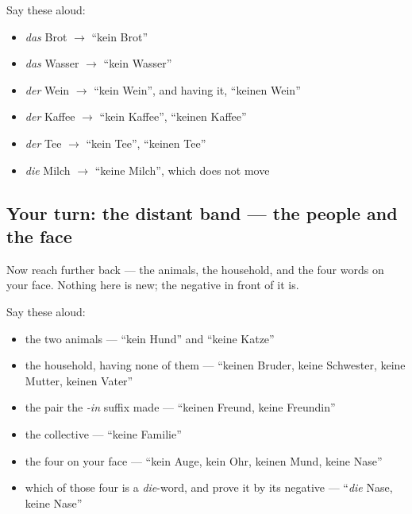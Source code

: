 Say these aloud:

\begin{itemize}
\raggedright
  \item \emph{das} Brot $\to$ \textquotedblleft{}kein Brot\textquotedblright{}
  \item \emph{das} Wasser $\to$ \textquotedblleft{}kein Wasser\textquotedblright{}
  \item \emph{der} Wein $\to$ \textquotedblleft{}kein Wein\textquotedblright{}, and having it, \textquotedblleft{}keinen Wein\textquotedblright{}
  \item \emph{der} Kaffee $\to$ \textquotedblleft{}kein Kaffee\textquotedblright{}, \textquotedblleft{}keinen Kaffee\textquotedblright{}
  \item \emph{der} Tee $\to$ \textquotedblleft{}kein Tee\textquotedblright{}, \textquotedblleft{}keinen Tee\textquotedblright{}
  \item \emph{die} Milch $\to$ \textquotedblleft{}keine Milch\textquotedblright{}, which does not move
\end{itemize}

\subsection*{Your turn: the distant band — the people and the face}
Now reach further back — the animals, the household, and the four words on your face. Nothing here is new; the negative in front of it is.

Say these aloud:

\begin{itemize}
\raggedright
  \item the two animals — \textquotedblleft{}kein Hund\textquotedblright{} and \textquotedblleft{}keine Katze\textquotedblright{}
  \item the household, having none of them — \textquotedblleft{}keinen Bruder, keine Schwester, keine Mutter, keinen Vater\textquotedblright{}
  \item the pair the \emph{-in} suffix made — \textquotedblleft{}keinen Freund, keine Freundin\textquotedblright{}
  \item the collective — \textquotedblleft{}keine Familie\textquotedblright{}
  \item the four on your face — \textquotedblleft{}kein Auge, kein Ohr, keinen Mund, keine Nase\textquotedblright{}
  \item which of those four is a \emph{die}-word, and prove it by its negative — \textquotedblleft{}\emph{die} Nase, keine Nase\textquotedblright{}
\end{itemize}


